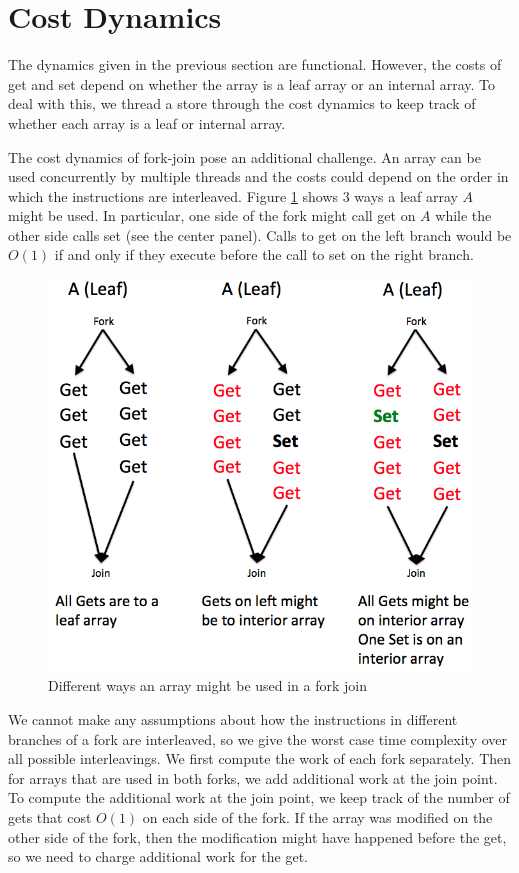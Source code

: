 \documentclass[preprint]{sigplanconf}
\begin{document}
\section{Cost Dynamics}

The dynamics given in the previous section are functional. However, the costs of get and set depend on whether the array is a leaf array or an internal array. To deal with this, we thread a store through the cost dynamics to keep track of whether each array is a leaf or internal array.

The cost dynamics of fork-join pose an additional challenge. An array can be used concurrently by multiple threads and the costs could depend on the order in which the instructions are interleaved. Figure \ref{fig:fork_join_intuition} shows 3 ways a leaf array $A$ might be used. In particular, one side of the fork might call get on $A$ while the other side calls set (see the center panel). Calls to get on the left branch would be $O(1)$ if and only if they execute before the call to set on the right branch.

\begin{figure}[!ht]
\centering
\includegraphics[scale=0.3]{fork_join_intuition}
\nocaptionrule \caption{Different ways an array might be used in a fork join}
\label{fig:fork_join_intuition}
\end{figure}

We cannot make any assumptions about how the instructions in different branches of a fork are interleaved, so we give the worst case time complexity over all possible interleavings. We first compute the work of each fork separately. Then for arrays that are used in both forks, we add additional work at the join point. To compute the additional work at the join point, we keep track of the number of gets that cost $O(1)$ on each side of the fork. If the array was modified on the other side of the fork, then the modification might have happened before the get, so we need to charge additional work for the get.
\end{document}
